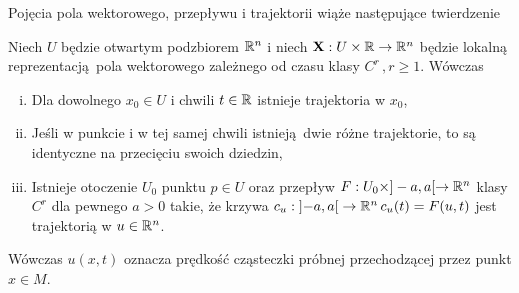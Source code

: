 Pojęcia pola wektorowego, przepływu i trajektorii wiąże następujące twierdzenie

\begin{twierdzenie}
    Niech \(U\) będzie otwartym podzbiorem \(\mathbb{R}^n\) i niech \(\mathbf{X}: U\times \mathbb{R} \rightarrow \mathbb{R}^n\) będzie lokalną reprezentacją pola wektorowego zależnego od czasu klasy \(C^r\,, r\geq 1\). Wówczas 
    \begin{enumerate}[i)]
        \item Dla dowolnego \(x_0\in U\) i chwili \(t\in \mathbb{R}\) istnieje trajektoria w \(x_0\),
    \item Jeśli w punkcie i w tej samej chwili istnieją dwie różne trajektorie, to są identyczne na przecięciu swoich dziedzin,
    \item Istnieje otoczenie \(U_0\) punktu \(p\in U\) oraz przepływ \(F: U_0 \times ]-a, a[ \rightarrow \mathbb{R}^n\) klasy \(C^r\) dla pewnego \(a>0\) takie, że krzywa \(c_u: \left]-a, a\right[\rightarrow \mathbb{R}^n\, c_u(t) = F(u, t)\) jest trajektorią w \(u\in \mathbb{R}^n\).
\end{enumerate}
\end{twierdzenie}
Wówczas \(u(x, t)\) oznacza prędkość cząsteczki próbnej przechodzącej przez punkt \(x\in M\). 
